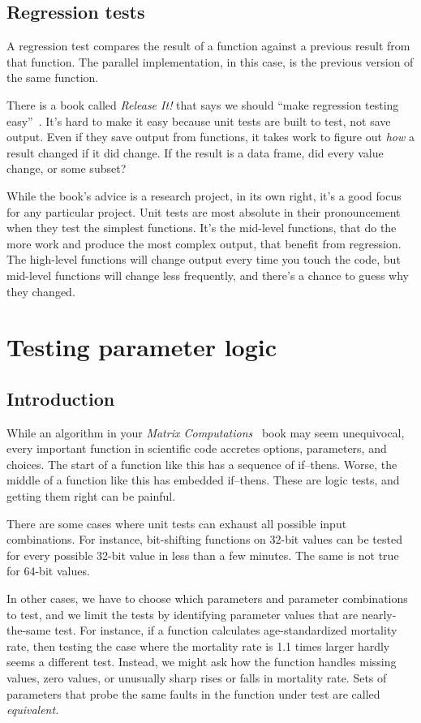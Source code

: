 \documentclass[fleqn,10pt]{olplainarticle}
\begin{document}
\subsection{Regression tests}
A regression test compares the result of a function against a previous
result from that function. The parallel implementation, in this case,
is the previous version of the same function.

There is a book called \emph{Release It!} that says we should
``make regression testing easy''~\cite{nygard2018release}. It's hard to make it easy
because unit tests are built to test, not save output. Even if
they save output from functions, it takes work to figure out
\emph{how} a result changed if it did change. If the result
is a data frame, did every value change, or some subset?

While the book's advice is a research project, in its own right,
it's a good focus for any particular project. Unit tests are
most absolute in their pronouncement when they test the simplest
functions. It's the mid-level functions, that do the more work
and produce the most complex output, that benefit from regression.
The high-level functions will change output every time you touch
the code, but mid-level functions will change less frequently,
and there's a chance to guess why they changed.



\section{Testing parameter logic}\label{sec:parameter-logic}
\subsection{Introduction}
While an algorithm in your \emph{Matrix Computations}~\citep{golub2013} book may seem
unequivocal, every important function in scientific code accretes
options, parameters, and choices.
The start of a function like this has
a sequence of if--thens. Worse, the middle of a function like this
has embedded if--thens. These are logic tests, and getting them
right can be painful.

There are some cases where unit tests can exhaust all possible
input combinations. For instance, bit-shifting functions on
32-bit values can be tested for every possible 32-bit value
in less than a few minutes. The same is not true for 64-bit values.

In other cases, we have to choose which parameters and parameter
combinations to test, and we limit the tests by identifying
parameter values that are nearly-the-same test. For instance,
if a function calculates age-standardized mortality rate, then testing
the case where the mortality rate is 1.1 times larger hardly seems
a different test. Instead, we might ask how the function handles
missing values, zero values, or unusually sharp rises or falls in
mortality rate. Sets of parameters that probe the same faults in
the function under test are called \emph{equivalent.}
\end{document}

